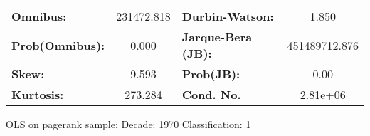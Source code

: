\begin{center}
\begin{tabular}{lccccc}
\bottomrule
\end{tabular}
\begin{tabular}{lclc}
\textbf{Omnibus:}       & 231472.818 & \textbf{  Durbin-Watson:     } &       1.850    \\
\textbf{Prob(Omnibus):} &    0.000   & \textbf{  Jarque-Bera (JB):  } & 451489712.876  \\
\textbf{Skew:}          &    9.593   & \textbf{  Prob(JB):          } &        0.00    \\
\textbf{Kurtosis:}      &  273.284   & \textbf{  Cond. No.          } &    2.81e+06    \\
\bottomrule
\end{tabular}
\end{center}
\break
OLS on pagerank sample: Decade: 1970 Classification: 1
